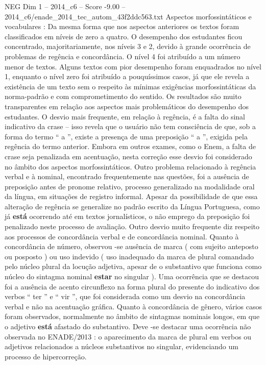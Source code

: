 \begin{textsample}{NEG Dim 1 – 2014\_c6 – Score -9.00 – 2014\_c6/enade\_2014\_tec\_autom\_43f2ddc563.txt}
Aspectos morfossintáticos e vocabulares : Da mesma forma que nos aspectos anteriores os textos foram classificados em níveis de zero a quatro.
O desempenho dos estudantes ficou concentrado, majoritariamente, nos níveis 3 e 2, devido à grande ocorrência de problemas de regência e concordância.
O nível 4 foi atribuído a um número menor de textos.
Alguns textos com pior desempenho foram enquadrados no nível 1, enquanto o nível zero foi atribuído a pouquíssimos casos, já que ele revela a existência de um texto sem o respeito às mínimas exigências morfossintáticas da norma-padrão e com comprometimento do sentido.
Os resultados são muito transparentes em relação aos aspectos mais problemáticos do desempenho dos estudantes.
O desvio mais frequente, em relação à regência, é a falta do sinal indicativo da crase – isso revela que o usuário não tem consciência de que, sob a forma do termo “ a ”, existe a presença de uma preposição “ a ”, exigida pela regência do termo anterior.
Embora em outros exames, como o Enem, a falta de crase seja penalizada em acentuação, nesta correção esse desvio foi considerado no âmbito dos aspectos morfossintáticos.
Outro problema relacionado à regência verbal e à nominal, encontrado frequentemente nas questões, foi a ausência de preposição antes de pronome relativo, processo generalizado na modalidade oral da língua, em situações de registro informal.
Apesar da possibilidade de que essa alteração de regência se generalize no padrão escrito da Língua Portuguesa, como já \textbf{está} ocorrendo até em textos jornalísticos, o não emprego da preposição foi penalizado neste processo de avaliação.
Outro desvio muito frequente diz respeito aos processos de concordância verbal e de concordância nominal.
Quanto à concordância de número, observou -se ausência de marca ( com sujeito anteposto ou posposto ) ou uso indevido ( uso inadequado da marca de plural comandado pelo núcleo plural da locução adjetiva, apesar de o substantivo que funciona como núcleo do sintagma nominal \textbf{estar} no singular ).
Uma ocorrência que se destacou foi a ausência de acento circunflexo na forma plural do presente do indicativo dos verbos “ ter ” e “ vir ”, que foi considerada como um desvio na concordância verbal e não na acentuação gráfica.
Quanto à concordância de gênero, vários casos foram observados, normalmente no âmbito de sintagmas nominais longos, em que o adjetivo \textbf{está} afastado do substantivo.
Deve -se destacar uma ocorrência não observada no ENADE/2013 : o aparecimento da marca de plural em verbos ou adjetivos relacionados a núcleos substantivos no singular, evidenciando um processo de hipercorreção.

\end{textsample}
